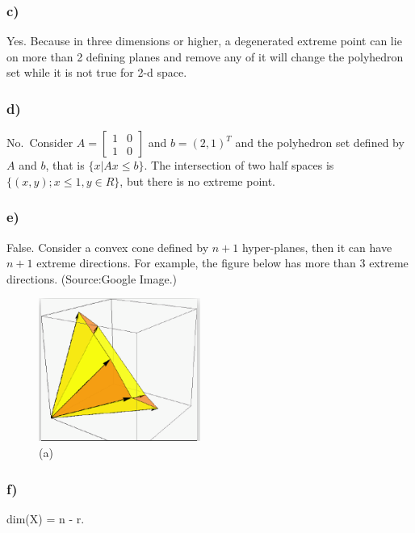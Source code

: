 \documentclass[11pt]{article}
\makeatletter
\def\maxwidth{\ifdim\Gin@nat@width>\linewidth\linewidth
    \else\Gin@nat@width\fi}
\let\Oldincludegraphics\includegraphics
\renewcommand{\includegraphics}[1]{\Oldincludegraphics[width=.8\maxwidth]{#1}}
\makeatother
\begin{document}
\hypertarget{c}{%
\subsubsection{c)}\label{c}}

Yes. Because in three dimensions or higher, a degenerated extreme point
can lie on more than 2 defining planes and remove any of it will change
the polyhedron set while it is not true for 2-d space.

\hypertarget{d}{%
\subsubsection{d)}\label{d}}

No.~Consider \(A= \begin{bmatrix}1 & 0 \\ 1 & 0\end{bmatrix}\) and
\(b=(2, 1)^T\) and the polyhedron set defined by \(A\) and \(b\), that
is \(\{x|Ax \leq b\}\). The intersection of two half spaces is
\(\{(x,y); x\leq 1, y\in R\}\), but there is no extreme point.

\hypertarget{e}{%
\subsubsection{e)}\label{e}}

False. Consider a convex cone defined by \(n+1\) hyper-planes, then it
can have \(n+1\) extreme directions. For example, the figure below has
more than 3 extreme directions. (Source:Google Image.)

\begin{figure}
\centering
\includegraphics{./figs/cone.png}
\caption{(a)}
\end{figure}

\hypertarget{f}{%
\subsubsection{f)}\label{f}}

dim(X) = n - r.
\end{document}
